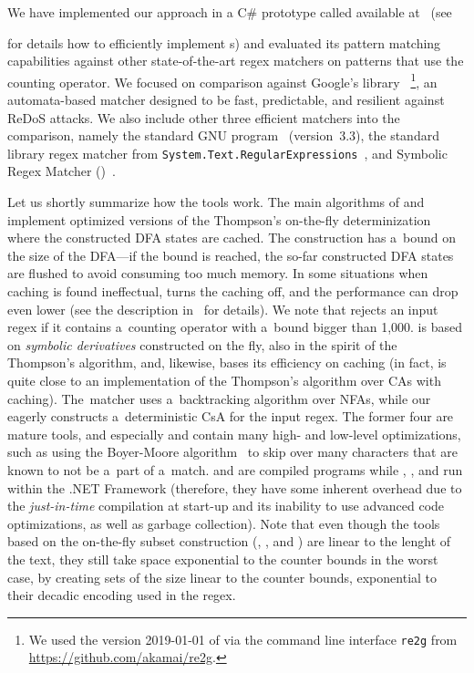 \documentclass[acmsmall,screen]{acmart}
\newif\ifTR
\begin{document}
We have implemented our approach in a C\#
prototype called \catool
available at~
(see
\ifTR
\cref{sec:Implementation}
\else
\cite{OOPSLA20TR}
\fi
for details how to efficiently implement
{\CSA}s)
and evaluated its pattern matching capabilities against other
state-of-the-art regex matchers on patterns that use the counting operator.
We focused on comparison against
Google's \retwo library~\cite{re2}%
\footnote{%
  We used the version 2019-01-01 of \retwo via the command line interface \texttt{re2g} from
  \url{https://github.com/akamai/re2g}.
}, an automata-based matcher designed to be fast, predictable, and resilient against ReDoS attacks.
We also include other three efficient matchers into the comparison, namely
the standard GNU \grep program~\cite{grep} (version~3.3),
the \dotnet standard library regex matcher from
\texttt{System.Text.RegularExpressions}~\cite{dotnet}, and
Symbolic Regex Matcher (\srm)~\cite{VSXW19}.

Let us shortly summarize how the tools work.
The main algorithms of
\retwo and \grep implement optimized versions of the Thompson's on-the-fly
determinization where the constructed DFA states are cached.
The construction has a~bound on the size of the DFA---if the bound is reached,
the so-far constructed DFA states are flushed to avoid consuming too much
memory.
In some situations when caching is found ineffectual, \retwo turns the caching
off,
and the performance can drop even lower 
 (see the description in~\cite{regexes-in-the-wild} for details).
We note that \retwo rejects an input regex if it contains a~counting
operator with a~bound bigger than 1,000.
%
\srm is based on \emph{symbolic derivatives} constructed on the fly, 
also in the spirit of the Thompson's algorithm, and, likewise, bases its efficiency
on caching
(in fact, \srm is quite close to an implementation of the Thompson's
algorithm over CAs with caching).
The~\dotnet matcher uses a~backtracking algorithm over NFAs, while
%
our \catool eagerly constructs a~deterministic CsA for the input regex.
%
The former four are mature tools, and especially \retwo and \grep contain many high- and low-level
optimizations, such as using the Boyer-Moore algorithm~\cite{BoyerM77} to skip
over many characters that are known to not be a~part of a~match.
%
\retwo and \grep are compiled programs while \catool, \srm, and
\dotnet run within the .NET Framework (therefore, they have some inherent
overhead due to the \emph{just-in-time} compilation at start-up and its
inability to use advanced code optimizations, as well as 
garbage collection). 
%
Note that even though the tools based on the on-the-fly subset construction (\retwo, \grep, and \srm) are linear to the lenght of the text, they still take space exponential to the counter bounds in the worst case, by creating sets of the size linear to the counter bounds, exponential to their decadic encoding used in the regex. 
\end{document}
